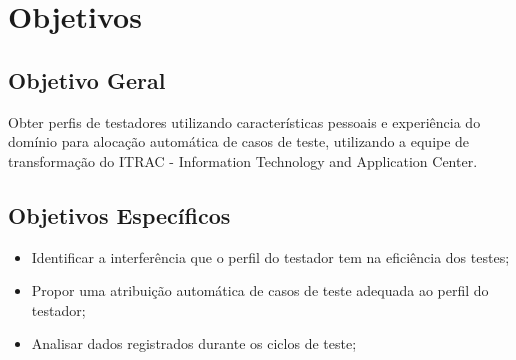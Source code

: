 \section{Objetivos}
\subsection{Objetivo Geral}

Obter perfis de testadores utilizando características pessoais e experiência do domínio para alocação automática de casos de teste, utilizando a equipe de transformação do ITRAC - Information Technology and Application Center.

\subsection{Objetivos Específicos}

\begin{itemize}
		\item Identificar a interferência que o perfil do testador tem na eficiência dos testes;
		\item Propor uma atribuição automática de casos de teste adequada ao perfil do testador; 
		\item Analisar dados registrados durante os ciclos de teste;
	\end{itemize}

